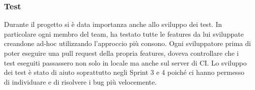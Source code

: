 \subsubsection{Test}
Durante il progetto si è data importanza anche allo sviluppo dei test.
In particolare ogni membro del team, ha testato tutte le features da lui sviluppate creandone ad-hoc utilizzando l'approccio più consono.
Ogni sviluppatore prima di poter eseguire una pull request della propria features, doveva controllare che i test eseguiti passassero non solo in locale ma anche sul server di CI.
Lo sviluppo dei test è stato di aiuto soprattutto negli Sprint 3 e 4 poiché ci hanno permesso di individuare e di risolvere i bug più velocemente.
\newpage